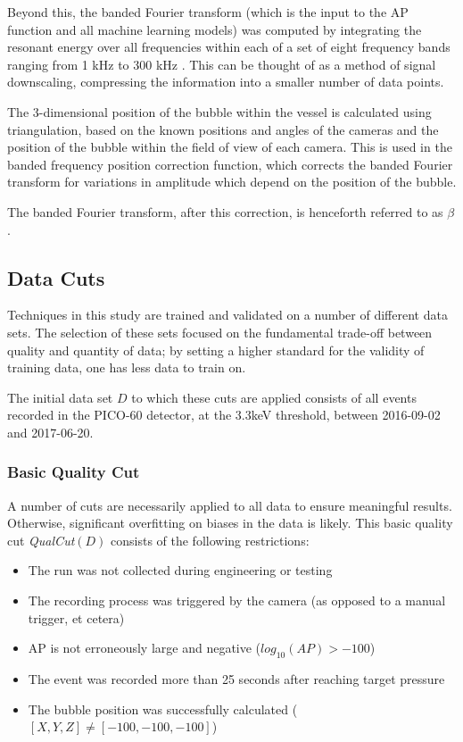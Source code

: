\documentclass[10pt]{article}
\begin{document}
Beyond this, the banded Fourier transform (which is the input to the AP function and all machine learning models) was computed by integrating the resonant energy over all frequencies within each of a set of eight frequency bands ranging from 1 kHz to 300 kHz \cite{pico}. This can be thought of as a method of signal downscaling, compressing the information into a smaller number of data points.

The 3-dimensional position of the bubble within the vessel is calculated using triangulation, based on the known positions and angles of the cameras and the position of the bubble within the field of view of each camera. This is used in the banded frequency position correction function, which corrects the banded Fourier transform for variations in amplitude which depend on the position of the bubble.

The banded Fourier transform, after this correction, is henceforth referred to as $\beta$.

\subsection{Data Cuts}

Techniques in this study are trained and validated on a number of different data sets. The selection of these sets focused on the fundamental trade-off between quality and quantity of data; by setting a higher standard for the validity of training data, one has less data to train on.

The initial data set $D$ to which these cuts are applied consists of all events recorded in the PICO-60 detector, at the 3.3keV threshold, between 2016-09-02 and 2017-06-20.

\subsubsection{Basic Quality Cut}

A number of cuts are necessarily applied to all data to ensure meaningful results. Otherwise, significant overfitting on biases in the data is likely. This basic quality cut {\it QualCut}$(D)$ consists of the following restrictions:

\begin{itemize}
    \item The run was not collected during engineering or testing
    \item The recording process was triggered by the camera (as opposed to a manual trigger, et cetera)
    \item AP is not erroneously large and negative ($log_{10}(AP)>-100$)
    \item The event was recorded more than 25 seconds after reaching target pressure
    \item The bubble position was successfully calculated ($[X, Y, Z]\neq[-100, -100, -100]$)
\end{itemize}
\end{document}
